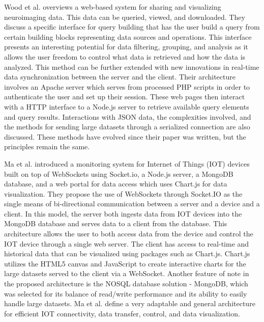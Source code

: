 Wood et al. \cite{neuro} overviews a web-based system for sharing and visualizing neuroimaging data.  This data can be queried, viewed, and downloaded.  They discuss a specific interface for query building that has the user build a query from certain building blocks representing data sources and operations.  This interface presents an interesting potential for data filtering, grouping, and analysis as it allows the user freedom to control what data is retrieved and how the data is analyzed.  This method can be further extended with new innovations in real-time data synchronization between the server and the client.  Their architecture involves an Apache server which serves from processed PHP scripts in order to authenticate the user and set up their session.  These web pages then interact with a HTTP interface to a Node.js server to retrieve available query elements and query results.  Interactions with JSON data, the complexities involved, and the methods for sending large datasets through a serialized connection are also discussed.  These methods have evolved since their paper was written, but the principles remain the same. \par
Ma et al. \cite{smartbuildings} introduced a monitoring system for Internet of Things (IOT) devices built on top of WebSockets using Socket.io, a Node.js server, a MongoDB database, and a web portal for data access which uses Chart.js for data visualization.  They propose the use of WebSockets through Socket.IO as the single means of bi-directional communication between a server and a device and a client.  In this model, the server both ingests data from IOT devices into the MongoDB database and serves data to a client from the database.  This architecture allows the user to both access data from the device and control the IOT device through a single web server.  The client has access to real-time and historical data that can be visualized using packages such as Chart.js.  Chart.js utilizes the HTML5 canvas and JavaScript to create interactive charts for the large datasets served to the client via a WebSocket.  Another feature of note in the proposed architecture is the NOSQL database solution - MongoDB, which was selected for its balance of read/write performance and its ability to easily handle large datasets.  Ma et al. \cite{smartbuildings}  define a very adaptable and general architecture for efficient IOT connectivity, data transfer, control, and data visualization. \par
